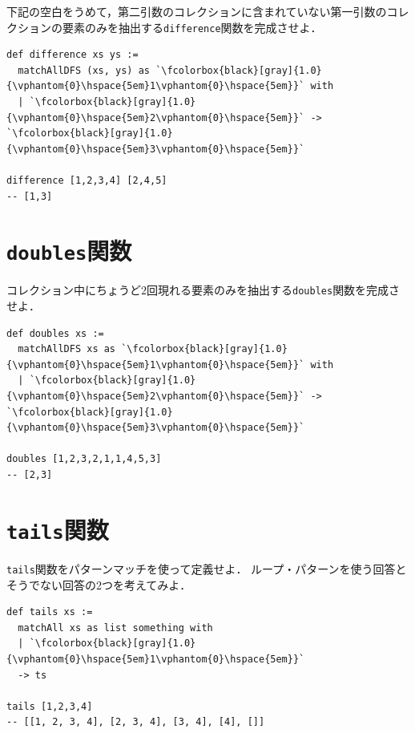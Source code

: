 下記の空白をうめて，第二引数のコレクションに含まれていない第一引数のコレクションの要素のみを抽出する\lstinline{difference}関数を完成させよ．

\begin{lstlisting}[language=egison]
def difference xs ys :=
  matchAllDFS (xs, ys) as `\fcolorbox{black}[gray]{1.0}{\vphantom{0}\hspace{5em}1\vphantom{0}\hspace{5em}}` with
  | `\fcolorbox{black}[gray]{1.0}{\vphantom{0}\hspace{5em}2\vphantom{0}\hspace{5em}}` -> `\fcolorbox{black}[gray]{1.0}{\vphantom{0}\hspace{5em}3\vphantom{0}\hspace{5em}}`

difference [1,2,3,4] [2,4,5]
-- [1,3]
\end{lstlisting}

\section*{\texttt{doubles}関数}

コレクション中にちょうど$2$回現れる要素のみを抽出する\lstinline{doubles}関数を完成させよ．

\begin{lstlisting}[language=egison]
def doubles xs :=
  matchAllDFS xs as `\fcolorbox{black}[gray]{1.0}{\vphantom{0}\hspace{5em}1\vphantom{0}\hspace{5em}}` with
  | `\fcolorbox{black}[gray]{1.0}{\vphantom{0}\hspace{5em}2\vphantom{0}\hspace{5em}}` -> `\fcolorbox{black}[gray]{1.0}{\vphantom{0}\hspace{5em}3\vphantom{0}\hspace{5em}}`

doubles [1,2,3,2,1,1,4,5,3]
-- [2,3]
\end{lstlisting}

\section*{\texttt{tails}関数}

\lstinline{tails}関数をパターンマッチを使って定義せよ．
ループ・パターンを使う回答とそうでない回答の2つを考えてみよ．

\begin{lstlisting}[language=egison]
def tails xs :=
  matchAll xs as list something with
  | `\fcolorbox{black}[gray]{1.0}{\vphantom{0}\hspace{5em}1\vphantom{0}\hspace{5em}}`
  -> ts

tails [1,2,3,4]
-- [[1, 2, 3, 4], [2, 3, 4], [3, 4], [4], []]
\end{lstlisting}

